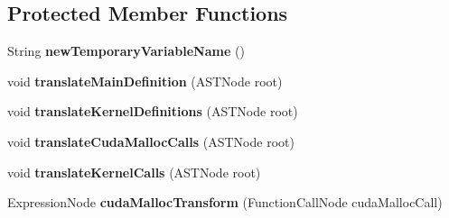 \subsection*{Protected Member Functions}
\begin{DoxyCompactItemize}
\item 
\hypertarget{classedu_1_1udel_1_1cis_1_1vsl_1_1civl_1_1transform_1_1common_1_1Cuda2CIVLWorker_a526805a53610dadedc78250de0e42abb}{}String {\bfseries new\+Temporary\+Variable\+Name} ()\label{classedu_1_1udel_1_1cis_1_1vsl_1_1civl_1_1transform_1_1common_1_1Cuda2CIVLWorker_a526805a53610dadedc78250de0e42abb}

\item 
\hypertarget{classedu_1_1udel_1_1cis_1_1vsl_1_1civl_1_1transform_1_1common_1_1Cuda2CIVLWorker_aa4e31e22c77928a76df81a66cc566105}{}void {\bfseries translate\+Main\+Definition} (A\+S\+T\+Node root)\label{classedu_1_1udel_1_1cis_1_1vsl_1_1civl_1_1transform_1_1common_1_1Cuda2CIVLWorker_aa4e31e22c77928a76df81a66cc566105}

\item 
\hypertarget{classedu_1_1udel_1_1cis_1_1vsl_1_1civl_1_1transform_1_1common_1_1Cuda2CIVLWorker_a6d0c23f6d367b1b8dedc3d423078926e}{}void {\bfseries translate\+Kernel\+Definitions} (A\+S\+T\+Node root)\label{classedu_1_1udel_1_1cis_1_1vsl_1_1civl_1_1transform_1_1common_1_1Cuda2CIVLWorker_a6d0c23f6d367b1b8dedc3d423078926e}

\item 
\hypertarget{classedu_1_1udel_1_1cis_1_1vsl_1_1civl_1_1transform_1_1common_1_1Cuda2CIVLWorker_a41cbda11e473651902de7d8c11b5f31e}{}void {\bfseries translate\+Cuda\+Malloc\+Calls} (A\+S\+T\+Node root)\label{classedu_1_1udel_1_1cis_1_1vsl_1_1civl_1_1transform_1_1common_1_1Cuda2CIVLWorker_a41cbda11e473651902de7d8c11b5f31e}

\item 
\hypertarget{classedu_1_1udel_1_1cis_1_1vsl_1_1civl_1_1transform_1_1common_1_1Cuda2CIVLWorker_a7d220624f942d7b7a546084fa0cbcbe9}{}void {\bfseries translate\+Kernel\+Calls} (A\+S\+T\+Node root)\label{classedu_1_1udel_1_1cis_1_1vsl_1_1civl_1_1transform_1_1common_1_1Cuda2CIVLWorker_a7d220624f942d7b7a546084fa0cbcbe9}

\item 
\hypertarget{classedu_1_1udel_1_1cis_1_1vsl_1_1civl_1_1transform_1_1common_1_1Cuda2CIVLWorker_acb5e5e06ec088e8cdad906eef65c29c4}{}Expression\+Node {\bfseries cuda\+Malloc\+Transform} (Function\+Call\+Node cuda\+Malloc\+Call)\label{classedu_1_1udel_1_1cis_1_1vsl_1_1civl_1_1transform_1_1common_1_1Cuda2CIVLWorker_acb5e5e06ec088e8cdad906eef65c29c4}


\end{DoxyCompactItemize}
